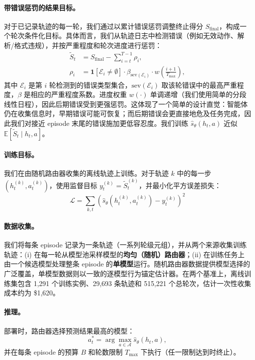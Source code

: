\paragraph{带错误惩罚的结果目标。}
对于已记录轨迹的每一轮，我们通过以累计错误惩罚调整终止得分 $S_{\text{final}}$，构成一个轮次条件化目标。具体而言，我们从轨迹日志中检测错误（例如无效动作、解析/格式违规），并按严重程度和轮次进度进行惩罚：
\begin{align}
    \label{eq:error}
\tilde{S}_t &= S_{\text{final}} - \sum_{i=t}^{T-1} \rho_i, \\
\rho_i &= \mathbf{1}[\mathcal{E}_i\neq\emptyset]\cdot \beta_{\mathrm{sev}(\mathcal{E}_i)}\cdot w\!\left(\tfrac{i+1}{T_{\max}}\right),
\end{align}
其中 $\mathcal{E}_i$ 是第 $i$ 轮检测到的错误类型集合，$\mathrm{sev}(\mathcal{E}_i)$ 取该轮错误中的最高严重程度，$\beta$ 是相应的严重程度系数。进度权重 $w(\cdot)$ 单调递增（我们使用简单的分段线性日程），因此后期错误受到更强惩罚。这体现了一个简单的设计直觉：智能体仍在收集信息时，早期错误可能可恢复；而后期错误会更直接地危及任务完成，因此我们对接近 episode 末尾的错误施加更低容忍度。我们训练 $\hat{s}_\theta(h_t,a)$ 近似 $\mathbb{E}[\tilde{S}_t \mid h_t,a]$。

\paragraph{训练目标。}
我们在由随机路由器收集的离线轨迹上训练。对于轨迹 $k$ 中的每一步 $(h_t^{(k)}, a_t^{(k)})$，使用监督目标 $y^{(k)}_t=\tilde{S}^{(k)}_t$，并最小化平方误差损失：
\begin{equation}
\mathcal{L} = \sum_{k,t} \left( \hat{s}_\theta(h_t^{(k)}, a_t^{(k)}) - y^{(k)}_t \right)^2
\end{equation}

\paragraph{数据收集。}
我们将每条 episode 记录为一条轨迹（一系列轮级元组），并从两个来源收集训练轨迹：(i) 在每一轮从模型池采样模型的\textbf{均匀（随机）路由器}；(ii) 在训练任务上由一个候选模型处理整条 episode 的\textbf{单模型}运行。随机路由器数据提供模型选择的广泛覆盖，单模型数据则以一致的逐模型行为锚定估计器。在两个基准上，离线训练集包含 1,291 个训练实例、29,693 条轨迹和 515,221 个总轮次，估计一次性收集成本约为 \$1,620。

\paragraph{推理。}
部署时，路由器选择预测结果最高的模型：
\begin{equation}
a_t^* = \arg\max_{a \in \mathcal{A}} \hat{s}_\theta(h_t, a),
\end{equation}
并在每条 episode 的预算 $B$ 和轮数限制 $T_{\max}$ 下执行（任一限制达到时终止）。

